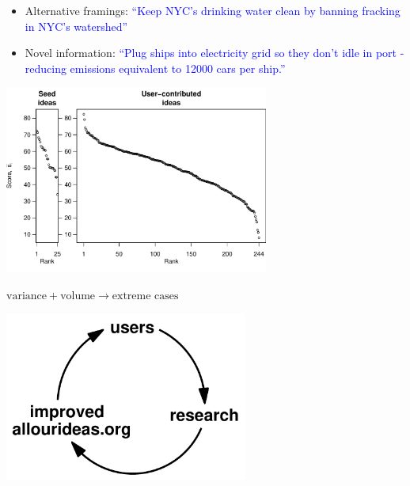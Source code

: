 \documentclass[aspectratio=169]{beamer}
\begin{document}
\begin{frame}
\frametitle{}

\begin{itemize}
\item Alternative framings: \textcolor{blue}{``Keep NYC's drinking water clean by banning fracking in NYC's watershed''}
\pause
\item Novel information: \textcolor{blue}{``Plug ships into electricity grid so they don't idle in port - reducing emissions equivalent to 12000 cars per ship.''}
\end{itemize}

\end{frame}
\begin{frame}

\begin{center}
\includegraphics[width=0.65\textwidth]{figures/planyc_sigma1_compare_seed_user-contributed}
\end{center}

\pause
\Large{
\begin{center}
$\mbox{variance} + \mbox{volume} \rightarrow \mbox{extreme cases}$ 
\end{center}
}

\end{frame}
\begin{frame}

\begin{center}
\includegraphics[width=0.6\textwidth]{figures/virtuous_cycle}
\end{center}

\end{frame}
\end{document}
